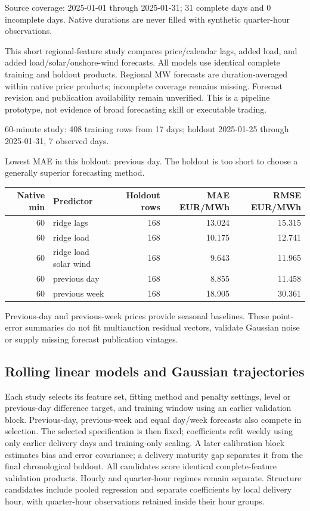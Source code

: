 \documentclass[11pt,a4paper]{article}
\begin{document}
Source coverage: 2025-01-01 through 2025-01-31; 31 complete days and 0 incomplete days. Native durations are never filled with synthetic quarter-hour observations.

This short regional-feature study compares price/calendar lags, added load, and added load/solar/onshore-wind forecasts. All models use identical complete training and holdout products. Regional MW forecasts are duration-averaged within native price products; incomplete coverage remains missing. Forecast revision and publication availability remain unverified. This is a pipeline prototype, not evidence of broad forecasting skill or executable trading.

60-minute study: 408 training rows from 17 days; holdout 2025-01-25 through 2025-01-31, 7 observed days.

Lowest MAE in this holdout: previous day. The holdout is too short to choose a generally superior forecasting method.

{\small\begin{longtable}{rlrrr}
\toprule Native min & Predictor & Holdout rows & MAE EUR/MWh & RMSE EUR/MWh \\ \midrule
\endhead
60 & ridge lags & 168 & 13.024 & 15.315 \\
60 & ridge load & 168 & 10.175 & 12.741 \\
60 & ridge load solar wind & 168 & 9.643 & 11.965 \\
60 & previous day & 168 & 8.855 & 11.458 \\
60 & previous week & 168 & 18.905 & 30.361 \\
\bottomrule\end{longtable}}

Previous-day and previous-week prices provide seasonal baselines. These point-error summaries do not fit multiauction residual vectors, validate Gaussian noise or supply missing forecast publication vintages.
\subsection{Rolling linear models and Gaussian trajectories}

Each study selects its feature set, fitting method and penalty settings, level or previous-day difference target, and training window using an earlier validation block. Previous-day, previous-week and equal day/week forecasts also compete in selection. The selected specification is then fixed; coefficients refit weekly using only earlier delivery days and training-only scaling. A later calibration block estimates bias and error covariance; a delivery maturity gap separates it from the final chronological holdout. All candidates score identical complete-feature validation products. Hourly and quarter-hour regimes remain separate. Structure candidates include pooled regression and separate coefficients by local delivery hour, with quarter-hour observations retained inside their hour groups.
\end{document}
